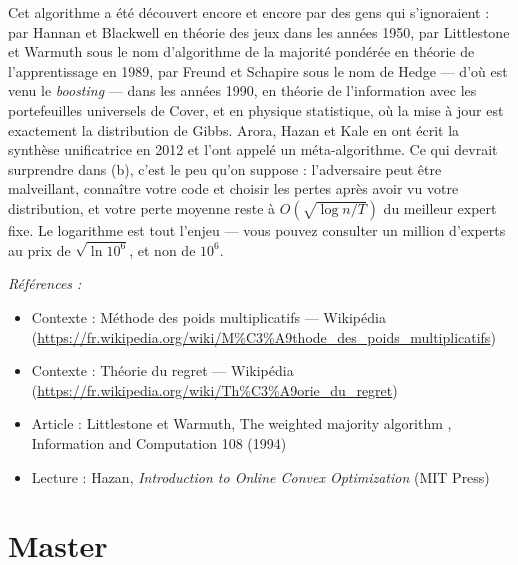 \documentclass[11pt]{article}
\newenvironment{refs}{\par\small\noindent\emph{Références :}\begin{itemize}\setlength\itemsep{0pt}}{\end{itemize}\normalsize}
\begin{document}
\noindent Cet algorithme a été découvert encore et encore par des gens qui s'ignoraient : par Hannan et Blackwell en théorie des jeux dans les années 1950, par Littlestone et Warmuth sous le nom d'algorithme de la majorité pondérée en théorie de l'apprentissage en 1989, par Freund et Schapire sous le nom de Hedge --- d'où est venu le \textit{boosting} --- dans les années 1990, en théorie de l'information avec les portefeuilles universels de Cover, et en physique statistique, où la mise à jour est exactement la distribution de Gibbs. Arora, Hazan et Kale en ont écrit la synthèse unificatrice en 2012 et l'ont appelé un méta-algorithme. Ce qui devrait surprendre dans (b), c'est le peu qu'on suppose : l'adversaire peut être malveillant, connaître votre code et choisir les pertes après avoir vu votre distribution, et votre perte moyenne reste à $O(\sqrt{\log n / T})$ du meilleur expert fixe. Le logarithme est tout l'enjeu --- vous pouvez consulter un million d'experts au prix de $\sqrt{\ln 10^6}$, et non de $10^6$.

\begin{refs}
\item Contexte : Méthode des poids multiplicatifs --- Wikipédia (\url{https://fr.wikipedia.org/wiki/M%C3%A9thode_des_poids_multiplicatifs})
\item Contexte : Théorie du regret --- Wikipédia (\url{https://fr.wikipedia.org/wiki/Th%C3%A9orie_du_regret})
\item Article : Littlestone et Warmuth, \og{} The weighted majority algorithm \fg{}, Information and Computation 108 (1994)
\item Lecture : Hazan, \textit{Introduction to Online Convex Optimization} (MIT Press)
\end{refs}

\bigskip


\section*{Master}
\end{document}

